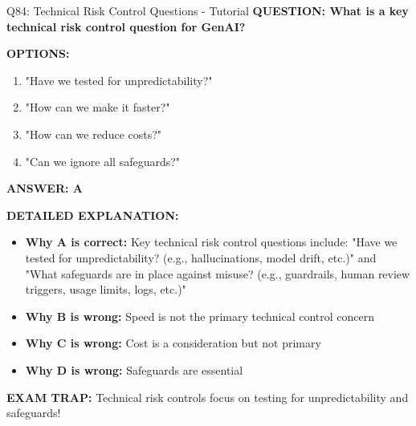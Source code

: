 \documentclass[8pt]{beamer}
\begin{document}
	\begin{frame}{Q84: Technical Risk Control Questions - Tutorial}
		\fontsize{6.5}{7.5}\selectfont
		\textbf{QUESTION: What is a key technical risk control question for GenAI?}
		
		\vspace{0.1cm}
		\textbf{OPTIONS:}
		\begin{enumerate}
			\item "Have we tested for unpredictability?"
			\item "How can we make it faster?"
			\item "How can we reduce costs?"
			\item "Can we ignore all safeguards?"
		\end{enumerate}
		
		\vspace{0.1cm}
		\textcolor{myblue}{\textbf{ANSWER: A}}
		
		\vspace{0.1cm}
		\textbf{DETAILED EXPLANATION:}
		\begin{itemize}
			\item \textbf{Why A is correct:} Key technical risk control questions include: "Have we tested for unpredictability? (e.g., hallucinations, model drift, etc.)" and "What safeguards are in place against misuse? (e.g., guardrails, human review triggers, usage limits, logs, etc.)"
			\item \textbf{Why B is wrong:} Speed is not the primary technical control concern
			\item \textbf{Why C is wrong:} Cost is a consideration but not primary
			\item \textbf{Why D is wrong:} Safeguards are essential
		\end{itemize}
		
		\textcolor{myred}{\textbf{EXAM TRAP:}} Technical risk controls focus on \textcolor{myblue}{testing for unpredictability and safeguards}!
	\end{frame}
	
\end{document}
